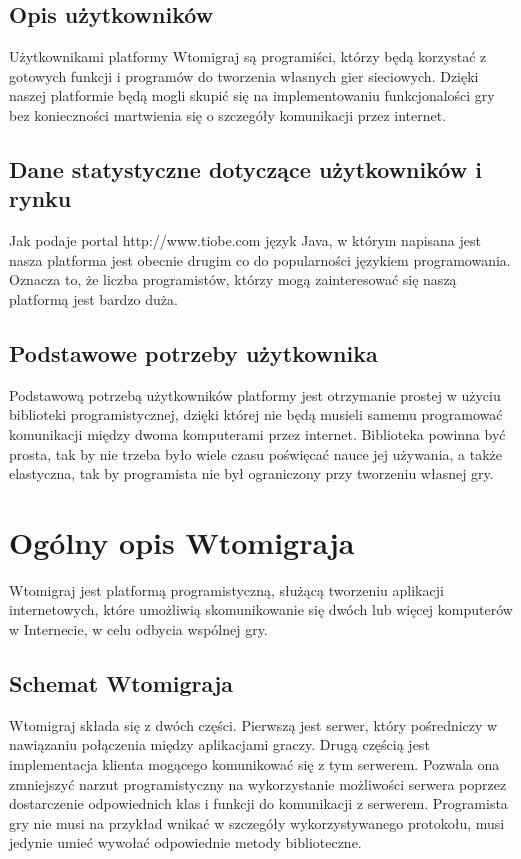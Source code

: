 \documentclass[a4paper, 12pt]{article}
\begin{document}
\subsection[Opis użytkowników]{Opis użytkowników}
Użytkownikami platformy Wtomigraj są programiści, którzy będą korzystać z gotowych funkcji i programów do tworzenia własnych gier sieciowych. Dzięki naszej platformie będą mogli skupić się na implementowaniu funkcjonalości gry bez konieczności martwienia się o szczegóły komunikacji przez internet. 

\subsection[Dane statystyczne dotyczące użytkowników i rynku]{Dane statystyczne dotyczące użytkowników i rynku}
Jak podaje portal http://www.tiobe.com język Java, w którym napisana jest nasza platforma jest obecnie drugim co do popularności językiem programowania. Oznacza to, że liczba programistów, którzy mogą zainteresować się naszą platformą jest bardzo duża.

\subsection[Podstawowe potrzeby użytkownika]{Podstawowe potrzeby użytkownika}
Podstawową potrzebą użytkowników platformy jest otrzymanie prostej w użyciu biblioteki programistycznej, dzięki której nie będą musieli samemu programować komunikacji między dwoma komputerami przez internet. Biblioteka powinna być prosta, tak by nie trzeba było wiele czasu poświęcać nauce jej używania, a także elastyczna, tak by programista nie był ograniczony przy tworzeniu własnej gry.

\section[Ogólny opis Wtomigraja]{Ogólny opis Wtomigraja}
Wtomigraj jest platformą programistyczną, służącą tworzeniu aplikacji internetowych, które umożliwią skomunikowanie się dwóch lub więcej komputerów w Internecie, w celu odbycia wspólnej gry.

\subsection[Schemat Wtomigraja]{Schemat Wtomigraja}
Wtomigraj składa się z dwóch części. Pierwszą jest serwer, który pośredniczy w nawiązaniu połączenia między aplikacjami graczy. Drugą częścią jest implementacja klienta mogącego komunikować się z tym serwerem. Pozwala ona zmniejszyć narzut programistyczny na wykorzystanie możliwości serwera poprzez dostarczenie odpowiednich klas i funkcji do komunikacji z serwerem. Programista gry nie musi na przykład wnikać w szczegóły wykorzystywanego protokołu, musi jedynie umieć wywołać odpowiednie metody biblioteczne. 
\end{document}
